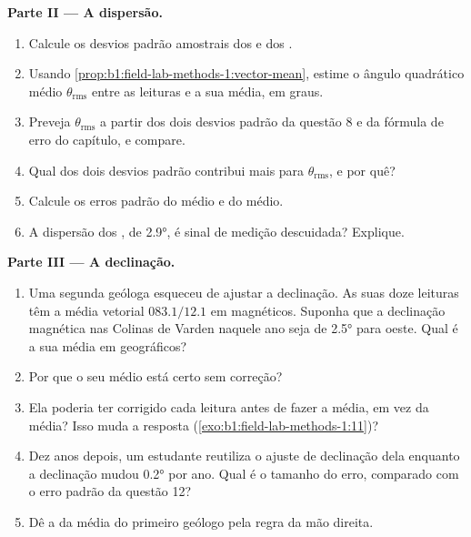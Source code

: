 \begin{problem}
\medskip
\noindent\textbf{Parte II --- A dispersão.}
\begin{enumerate}[resume]
  \item Calcule os desvios padrão amostrais dos  e dos .
  \item Usando \cref{prop:b1:field-lab-methods-1:vector-mean}, estime o ângulo quadrático médio $\theta_{\text{rms}}$ entre as leituras e a sua média, em graus.
  \item Preveja $\theta_{\text{rms}}$ a partir dos dois desvios padrão da questão 8 e da fórmula de erro do capítulo, e compare.
  \item Qual dos dois desvios padrão contribui mais para $\theta_{\text{rms}}$, e por quê?
  \item Calcule os erros padrão do  médio e do  médio.
  \item A dispersão dos , de \ang{2.9}, é sinal de medição descuidada? Explique.
\end{enumerate}

\medskip
\noindent\textbf{Parte III --- A declinação.}
\begin{enumerate}[resume]
  \item Uma segunda geóloga esqueceu de ajustar a declinação. As suas doze leituras têm a média vetorial $083.1/12.1$ em  magnéticos. Suponha que a declinação magnética nas Colinas de Varden naquele ano seja de \ang{2.5} para oeste. Qual é a sua média em  geográficos?
  \item Por que o seu  médio está certo sem correção?
  \item Ela poderia ter corrigido cada leitura antes de fazer a média, em vez da média? Isso muda a resposta (\cref{exo:b1:field-lab-methods-1:11})?
  \item Dez anos depois, um estudante reutiliza o ajuste de declinação dela enquanto a declinação mudou \ang{0.2} por ano. Qual é o tamanho do erro, comparado com o erro padrão da questão 12?
  \item Dê a  da  média do primeiro geólogo pela regra da mão direita.
\end{enumerate}


\end{problem}
